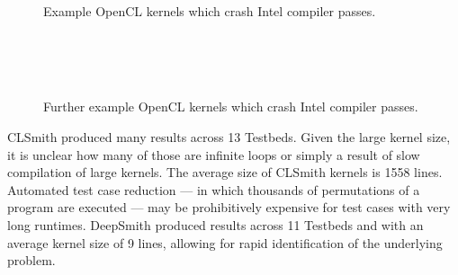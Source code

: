 \begin{figure}
  \centering
  \\%
  \\%
  \\%
  \\%
  \\%
  \caption[Example kernels which crash Intel compiler passes]{%
    Example OpenCL kernels which crash Intel compiler passes.%
  }%
  \label{lst:intel-passes}
\end{figure}

\begin{figure}
	\centering
	\\%
	\\%
	\\%
	\caption[Further example kernels which crash Intel compiler passes]{%
    Further example OpenCL kernels which crash Intel compiler passes.%
	}%
	\label{lst:further-intel-passes}
\end{figure}

CLSmith produced many \bto results across 13 Testbeds. Given the large kernel size, it is unclear how many of those are infinite loops or simply a result of slow compilation of large kernels. The average size of CLSmith \bto kernels is 1558 lines. Automated test case reduction --- in which thousands of permutations of a program are executed --- may be prohibitively expensive for test cases with very long runtimes. DeepSmith produced \bto results across 11 Testbeds and with an average kernel size of 9 lines, allowing for rapid identification of the underlying problem.

